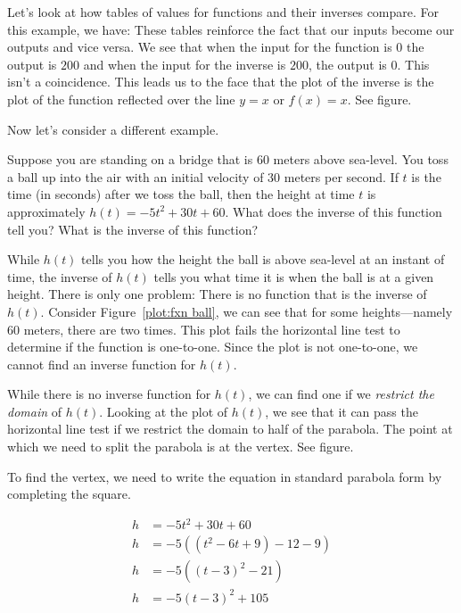 \documentclass{ximera}
\begin{document}
Let's look at how tables of values for functions and their inverses
compare.  For this example, we have:
These tables reinforce the fact that our inputs become our outputs and vice versa.  We see that when the input for the function is $0$ the output is $200$ and when the input for the inverse is $200$, the output is $0$.  This isn't a coincidence.  This leads us to the face that the plot of the inverse is the plot of the function reflected over the line $y=x$ or $f(x)=x$.  See figure.

Now let's consider a different example.

\begin{example}\label{E:example-ball-bridge}
Suppose you are standing on a bridge that is 60 meters above
sea-level. You toss a ball up into the air with an initial velocity of
30 meters per second.  If $t$ is the time (in seconds) after we toss
the ball, then the height at time $t$ is approximately $h(t) = -5 t^2
+30t+60$. What does the inverse of this function tell you? What is the inverse
of this function?
\begin{explanation}
While $h(t)$ tells you how the height the ball is above sea-level at an
instant of time, the inverse of $h(t)$ tells you what time it is when
the ball is at a given height. There is only one problem: There is no
function that is the inverse of $h(t)$. Consider Figure~\ref{plot:fxn
  ball}, we can see that for some heights---namely 60 meters, there
are two times. This plot fails the horizontal line test to determine if the function is one-to-one.  Since the plot is not one-to-one, we cannot find an inverse function for $h(t)$.

While there is no inverse function for $h(t)$, we can find one if we
\textit{restrict the domain} of $h(t)$.  Looking at the plot of $h(t)$, we see that it can pass the horizontal line test if we restrict the domain to half of the parabola.  The point at which we need to split the parabola is at the vertex. See figure.

To find the vertex, we need to write the equation in standard parabola form by completing the square.

\begin{align*}
h &= -5t^2+30t+60\\
h &=-5\left((t^2-6t+9)-12-9\right)\\
h &=-5\left((t-3)^2-21\right)\\
h &=-5(t-3)^2+105
\end{align*}


\end{explanation}
\end{example}
\end{document}
